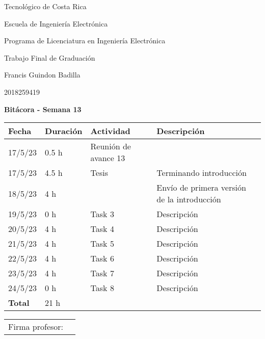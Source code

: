 \documentclass[12pt,oneside]{book}
\begin{document}
 \graphicspath{{./}{../tesis/fig/}}
  Tecnológico de Costa Rica
  \par\vspace{1mm}
  Escuela de Ingeniería Electrónica
  \par\vspace{1mm}
  Programa de Licenciatura en Ingeniería Electrónica
  \par\vspace{10mm}
  Trabajo Final de Graduación
  \par\vspace{1mm}
  Francis Guindon Badilla
  \par\vspace{1mm}
  2018259419
  \par\vspace{10mm}
  \large\textbf{Bitácora - Semana 13}
  \par\vspace{10mm}
  \small

  \begin{table} [!h]
    \centering
    \small
    \begin{tabular}{p{1.5 cm} p{2.1 cm} p{5 cm} p{8 cm}}
      \hline
      Fecha & Duración & Actividad & Descripción \\
      \hline
      17/5/23 & 0.5 h & Reunión de avance 13 & \\
      17/5/23 & 4.5 h & Tesis & Terminando introducción \\
      18/5/23 & 4 h & & Envío de primera versión de la introducción \\
      19/5/23 & 0 h & Task 3 & Descripción \\
      20/5/23 & 4 h & Task 4 & Descripción \\
      21/5/23 & 4 h & Task 5 & Descripción \\
      22/5/23 & 4 h & Task 6 & Descripción \\
      23/5/23 & 4 h & Task 7 & Descripción \\
      24/5/23 & 0 h & Task 8 & Descripción \\
      \hline
      \textbf{Total} & 21 h \\
      \hline
    \end{tabular}
  \end{table}
  
  \vfill

  \begin{tabular}{p{3 cm} p{10 cm}}
    Firma profesor: & \\
    \cline{2-2}
  \end{tabular}
\end{document}
